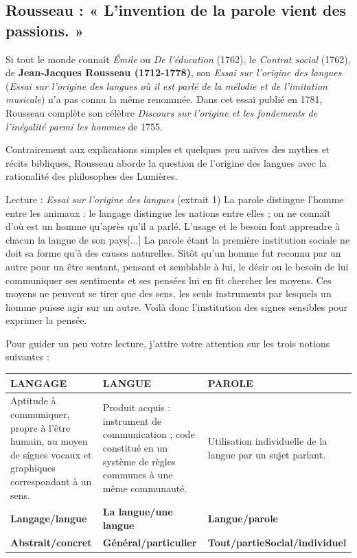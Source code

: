 \subsection{Rousseau : « L’invention de la parole vient des passions. »}
Si tout le monde connaît \textit{Émile} ou \textit{De l’éducation} (1762), le \textit{Contrat social} (1762), de \textbf{Jean-Jacques Rousseau (1712-1778)}, son \textit{Essai sur l’origine des langues} (\textit{Essai sur l’origine des langues où il est parlé de la mélodie et de l’imitation musicale}) n’a pas connu la même renommée. Dans cet essai publié en 1781, Rousseau complète son célèbre \textit{Discours sur l’origine et les fondements de l’inégalité parmi les hommes} de 1755.

Contrairement aux explications simples et quelques peu naïves des mythes et récits bibliques, Rousseau aborde la question de l’origine des langues avec la rationalité des philosophes des Lumières.
\begin{lecture}{Lecture : \textit{Essai sur l’origine des langues} (extrait 1)}
La parole distingue l’homme entre les animaux : le langage distingue les nations entre elles ; on ne connaît d’où est un homme qu’après qu’il a parlé. L’usage et le besoin font apprendre à chacun la langue de son pays[...] La parole étant la première institution sociale ne doit sa forme qu’à des causes naturelles. Sitôt qu’un homme fut reconnu par un autre pour un être sentant, pensant et semblable à lui, le désir ou le besoin de lui communiquer ses sentiments et ses pensées lui en fit chercher les moyens. Ces moyens ne peuvent se tirer que des sens, les seuls instruments par lesquels un homme puisse agir sur un autre. Voilà donc l’institution des signes sensibles pour exprimer la pensée.
\end{lecture}
Pour guider un peu votre lecture, j’attire votre attention sur les trois notions suivantes :
\begin{center}\small
\renewcommand{\arraystretch}{1.2}
\begin{tabularx}{\linewidth}{|>{\RaggedRight\arraybackslash}X|>{\RaggedRight\arraybackslash}X|>{\RaggedRight\arraybackslash}X|}
\hline
\centering\textbf{LANGAGE}&\centering\textbf{LANGUE}&\centering\arraybackslash\textbf{PAROLE}\\\hline
Aptitude à communiquer, propre à l’être humain, au moyen de signes vocaux et graphiques correspondant à un sens.&Produit acquis : instrument de communication ; code constitué en un système de règles communes à une même communauté.&Utilisation individuelle de la langue par un sujet parlant.\\\hline
\centering\textbf{Langage/langue}&\centering\textbf{La langue/une langue}&\centering\arraybackslash\textbf{Langue/parole}\\\hline
\centering\textbf{Abstrait/concret}&\centering\textbf{Général/particulier}&\centering\arraybackslash\textbf{Tout/partie}\newline\textbf{Social/individuel}\\\hline
\end{tabularx}
\end{center}
